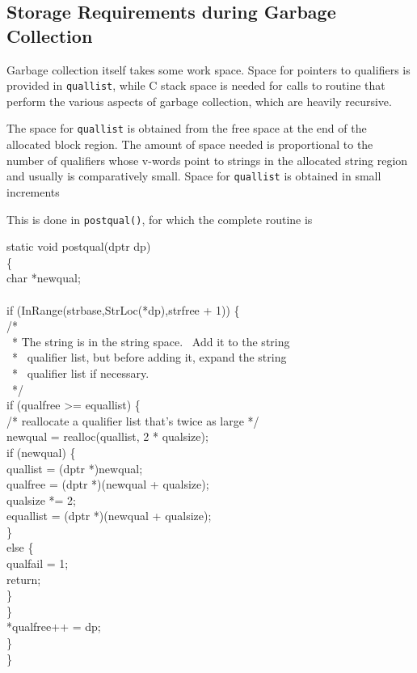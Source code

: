 \subsection{Storage Requirements during Garbage Collection}

Garbage collection itself takes some work space. Space for pointers to
qualifiers is provided in \texttt{quallist}, while C stack space is
needed for calls to routine that perform the various aspects of
garbage collection, which are heavily recursive.

The space for \texttt{quallist} is obtained from the free space at the
end of the allocated block region. The amount of space needed is
proportional to the number of qualifiers whose v-words point to
strings in the allocated string region and usually is comparatively
small. Space for \texttt{quallist} is obtained in small increments

This is done in \texttt{postqual()}, for which the complete routine is

\begin{iconcode}
static void postqual(dptr dp)\\
\>\{\\
\>char *newqual;\\
\\
\>if (InRange(strbase,StrLoc(*dp),strfree + 1)) \{\\
\>\>/*\\
\>\>\ * The string is in the string space. \ Add it to the string\\
\>\>\ * \ qualifier list, but before adding it, expand the string\\
\>\>\ * \ qualifier list if necessary.\\
\>\>\ */\\
\>\>if (qualfree >= equallist) \{\\
\>\>\>/* reallocate a qualifier list that's twice as large */\\
\>\>\>newqual = realloc(quallist, 2 * qualsize);\\
\>\>\>if (newqual) \{\\
\>\>\>\>quallist = (dptr *)newqual;\\
\>\>\>\>qualfree = (dptr *)(newqual + qualsize);\\
\>\>\>\>qualsize *= 2;\\
\>\>\>\>equallist = (dptr *)(newqual + qualsize);\\
\>\>\>\>\}\\
\>\>\>else \{\\
\>\>\>\>qualfail = 1;\\
\>\>\>\>return;\\
\>\>\>\>\}\\
\>\>\>\}\\
\>\>*qualfree++ = dp;\\
\>\>\}\\
\>\}
\end{iconcode}

